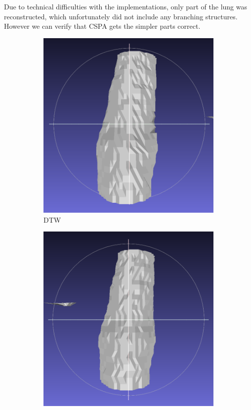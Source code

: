 \documentclass[11p, titlepage]{article}
\begin{document}
Due to technical difficulties with the implementations, only part of the lung was reconstructed, which unfortunately did not include any branching structures. However we can verify that CSPA gets the simpler parts correct.

\begin{figure}[h!]
     \centering
     \begin{subfigure}[b]{0.45\textwidth}
         \centering
         \includegraphics[width=\textwidth]{reconstructions/dtw-real}
         \caption{DTW}
         \label{fig:dtw_real}
     \end{subfigure}
     \hfill
     \begin{subfigure}[b]{0.45\textwidth}
         \centering
         \includegraphics[width=\textwidth]{reconstructions/cspa50-real}

\end{subfigure}
\end{figure}
\end{document}
